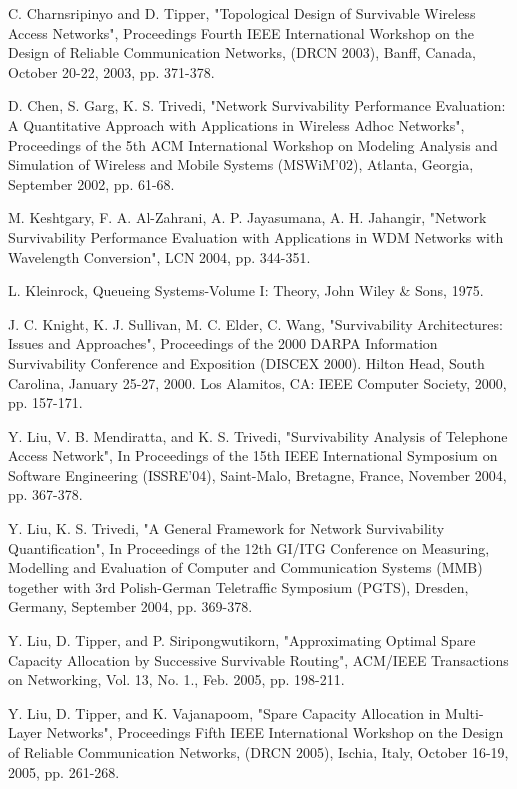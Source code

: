 \documentclass[conference]{IEEEtran}
\begin{document}
    \begin{thebibliography}{00}
         C. Charnsripinyo and D. Tipper, "Topological Design of Survivable Wireless Access Networks", Proceedings Fourth IEEE International Workshop on the Design of Reliable Communication Networks, (DRCN 2003), Banff, Canada, October 20-22, 2003, pp. 371-378.

         D. Chen, S. Garg, K. S. Trivedi, "Network Survivability Performance Evaluation: A Quantitative Approach with Applications in Wireless Adhoc Networks", Proceedings of the 5th ACM International Workshop on Modeling Analysis and Simulation of Wireless and Mobile Systems (MSWiM'02), Atlanta, Georgia, September 2002, pp. 61-68.

         M. Keshtgary, F. A. Al-Zahrani, A. P. Jayasumana, A. H. Jahangir, "Network Survivability Performance Evaluation with Applications in WDM Networks with Wavelength Conversion", LCN 2004, pp. 344-351.

         L. Kleinrock, Queueing Systems-Volume I: Theory, John Wiley \& Sons, 1975.

         J. C. Knight, K. J. Sullivan, M. C. Elder, C. Wang, "Survivability Architectures: Issues and Approaches", Proceedings of the 2000 DARPA Information Survivability Conference and Exposition (DISCEX 2000). Hilton Head, South Carolina, January 25-27, 2000. Los Alamitos, CA: IEEE Computer Society, 2000, pp. 157-171.

         Y. Liu, V. B. Mendiratta, and K. S. Trivedi, "Survivability Analysis of Telephone Access Network", In Proceedings of the 15th IEEE International Symposium on Software Engineering (ISSRE'04), Saint-Malo, Bretagne, France, November 2004, pp. 367-378.

         Y. Liu, K. S. Trivedi, "A General Framework for Network Survivability Quantification", In Proceedings of the 12th GI/ITG Conference on Measuring, Modelling and Evaluation of Computer and Communication Systems (MMB) together with 3rd Polish-German Teletraffic Symposium (PGTS), Dresden, Germany, September 2004, pp. 369-378.

         Y. Liu, D. Tipper, and P. Siripongwutikorn, "Approximating Optimal Spare Capacity Allocation by Successive Survivable Routing", ACM/IEEE Transactions on Networking, Vol. 13, No. 1., Feb. 2005, pp. 198-211.

         Y. Liu, D. Tipper, and K. Vajanapoom, "Spare Capacity Allocation in Multi-Layer Networks", Proceedings Fifth IEEE International Workshop on the Design of Reliable Communication Networks, (DRCN 2005), Ischia, Italy, October 16-19, 2005, pp. 261-268.


\end{thebibliography}
\end{document}
